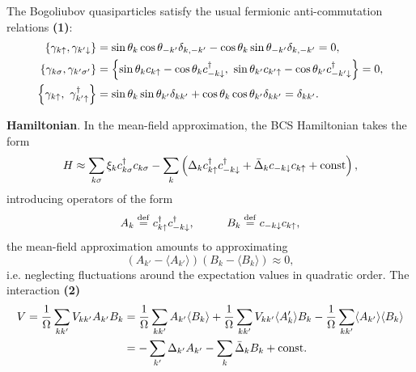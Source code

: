 The Bogoliubov quasiparticles satisfy the usual fermionic anti-commutation
relations \textbf{(1)}:
\begin{align*}
	\left\{\gamma_{k \up}, \gamma_{k' \down}\right\} &= \sin \theta_k \cos \theta_{-k'} \delta_{k,-k'} - \cos \theta_k \sin \theta_{-k'} \delta_{k, -k'} = 0, \\
	\{\gamma_{k \sigma}, \gamma_{k' \sigma'}\} &= \left\{
		\sin \theta_k c_{k \up} - \cos \theta_k c_{-k \down}\D,
		\ 
		\sin \theta_{k'} c_{k' \up} - \cos \theta_{k'} c_{-k' \down}\D
	\right\} = 0, \\
	\left\{ 
		\gamma_{k \up}, \ \gamma_{k' \up}\D
	\right\} &= \sin \theta_k \sin \theta_{k'} \delta_{k k'} + \cos \theta_k \cos \theta_{k'} \delta_{k k'} = \delta_{k k'}.
\end{align*}

\textbf{Hamiltonian}. In the mean-field approximation, the BCS Hamiltonian takes the form
\begin{equation*}
	H \approx \sum_{k \sigma} \xi_k c_{k \sigma}^{\dag} c_{k \sigma} -
	 \sum_k \left(
	 	\Delta_k c^{\dag}_{k \uparrow}c_{-k\downarrow}^{\dag} + \bar{\Delta}_k c_{-k \downarrow} c_{k \uparrow} + \textnormal{const}
	 \right),
\end{equation*}
introducing operators of the form
\begin{equation*}
A_k \overset{\mathrm{def}}{=} c_{k \up}\D c_{-k \down}\D,
\hspace{10 mm} 
B_k \overset{\mathrm{def}}{=} c_{-k \down} c_{k \up},
\end{equation*}
 the mean-field approximation
amounts to approximating
\begin{equation*}
	\left(A_{k'} - \langle A_{k'}\rangle\right)(B_{k} - \langle B_k\rangle) \approx 0,
\end{equation*}
i.e. neglecting fluctuations around
the expectation values in quadratic order. 
The interaction \textbf{(2)}
\begin{align*}
	V = \frac{1}{\Omega} \sum_{k k'} V_{k k'}  A_{k'} B_{k} &= 
	\frac{1}{\Omega} \sum_{k k'} A_{k'} \langle B_k\rangle + \frac{1}{\Omega} \sum_{k k'} V_{k k'} \langle A_k'\rangle B_k - \frac{1}{\Omega} \sum_{k k'} \langle A_{k'}\rangle \langle B_{k}\rangle 
	\\
	&= - \sum_{k'} \Delta_{k'} A_{k'} - \sum_k \bar{\Delta}_k B_{k} + \textnormal{const}.
\end{align*}



